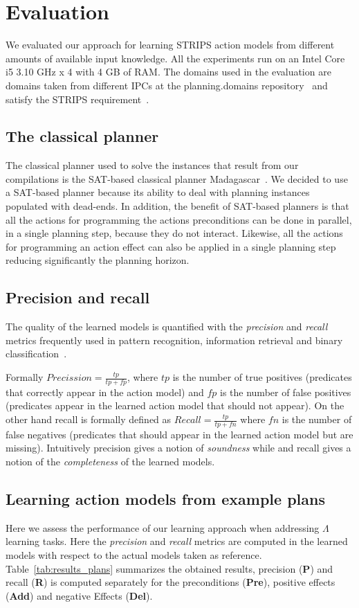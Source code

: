 \documentclass[letterpaper]{article} %
\begin{document}
\section{Evaluation}
We evaluated our approach for learning STRIPS action models from different amounts of available input knowledge. All the experiments run on an Intel Core i5 3.10 GHz x 4 with 4 GB of RAM. The domains used in the evaluation are domains taken from different IPCs at the {\sc planning.domains} repository~\cite{muise2016planning} and satisfy the STRIPS requirement~\cite{fox2003pddl2}.

\subsection{The classical planner}
The classical planner used to solve the instances that result from our compilations is the SAT-based classical planner {\sc Madagascar}~\cite{rintanen2014madagascar}. We decided to use a SAT-based planner because its ability to deal with planning instances populated with dead-ends. In addition, the benefit of SAT-based planners is that all the actions for programming the actions preconditions can be done in parallel, in a single planning step, because they do not interact. Likewise, all the actions for programming an action effect can also be applied in a single planning step reducing significantly the planning horizon.  


\subsection{Precision and recall}
The quality of the learned models is quantified with the {\em precision} and {\em recall} metrics frequently used in pattern recognition, information retrieval and binary classification~\cite{davis2006relationship}. 

Formally $Precission=\frac{tp}{tp+fp}$, where $tp$ is the number of true positives (predicates that correctly appear in the action model) and $fp$ is the number of false positives (predicates appear in the learned action model that should not appear). On the other hand recall is formally defined as $Recall=\frac{tp}{tp+fn}$ where $fn$ is the number of false negatives (predicates that should appear in the learned action model but are missing). Intuitively precision gives a notion of {\em soundness} while and recall gives a notion of the {\em completeness} of the learned models.


\subsection{Learning action models from example plans}
Here we assess the performance of our learning approach when addressing $\Lambda$ learning tasks. Here the {\em precision} and {\em recall} metrics are computed in the learned models with respect to the actual models taken as reference. Table~\ref{tab:results_plans} summarizes the obtained results, precision ({\bf P}) and recall ({\bf R}) is computed separately for the preconditions ({\bf Pre}), positive effects ({\bf Add}) and negative Effects ({\bf Del}). 
\end{document}
